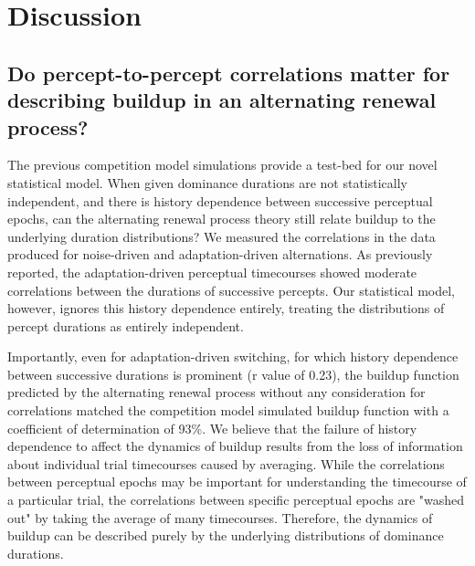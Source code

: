 \documentclass[10pt]{article}
\begin{document}
\section*{Discussion}

\subsection*{Do percept-to-percept correlations matter for describing buildup in an alternating renewal process?}

The previous competition model simulations provide a test-bed for our novel statistical model. When given dominance durations are not statistically independent, and there is history dependence between successive perceptual epochs, can the alternating renewal process theory still relate buildup to the underlying duration distributions? We measured the correlations in the data produced for noise-driven and adaptation-driven alternations. As previously reported, the adaptation-driven perceptual timecourses showed moderate correlations between the durations of successive percepts. Our statistical model, however, ignores this history dependence entirely, treating the distributions of percept durations as entirely independent. 

Importantly, even for adaptation-driven switching, for which history dependence between successive durations is prominent (r value of 0.23), the buildup function predicted by the alternating renewal process without any consideration for correlations matched the competition model simulated buildup function with a coefficient of determination of 93\%. We believe that the failure of history dependence to affect the dynamics of buildup results from the loss of information about individual trial timecourses caused by averaging. While the correlations between perceptual epochs may be important for understanding the timecourse of a particular trial, the correlations between specific perceptual epochs are "washed out" by taking the average of many timecourses. Therefore, the dynamics of buildup can be described purely by the underlying distributions of dominance durations.
\end{document}
